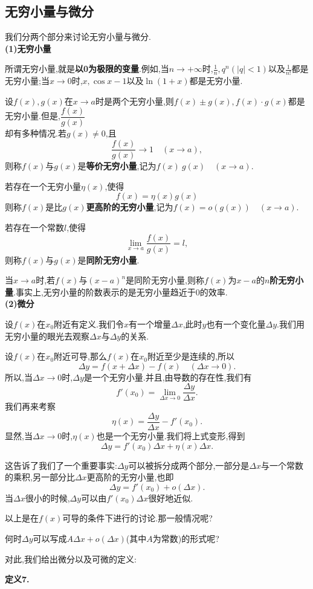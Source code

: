 \documentclass{article}
\begin{document}
\subsection{无穷小量与微分}
我们分两个部分来讨论无穷小量与微分.\\
\textbf{(1)\quad 无穷小量}
\par 所谓无穷小量,就是\textbf{以0为极限的变量}.例如,当$n\to+\infty$时,$\frac{1}{n},q^n(|q|<1)$以及$\frac{1}{n!}$都是无穷小量;当$x\to0$时,$x,\cos{x}-1$以及$\ln{(1+x)}$都是无穷小量.
\par 设$f(x),g(x)$在$x\to a$时是两个无穷小量,则$f(x)\pm g(x),f(x)\cdot g(x)$都是无穷小量.但是,$\dfrac{f(x)}{g(x)}$\\却有多种情况.若$g(x)\neq0$,且
\[\frac{f(x)}{g(x)}\to1\quad(x\to a),\]
则称$f(x)$与$g(x)$是\textbf{等价无穷小量},记为$f(x)~g(x)\quad(x\to a)$.
\par 若存在一个无穷小量$\eta(x)$,使得
\[f(x)=\eta(x)g(x)\]
则称$f(x)$是比$g(x)$\textbf{更高阶的无穷小量},记为$f(x)=o(g(x))\quad(x\to a)$.
\par 若存在一个常数$l$,使得
\[\lim\limits_{x\to a}\frac{f(x)}{g(x)}=l,\]
则称$f(x)$与$g(x)$是\textbf{同阶无穷小量}.
\par 当$x\to a$时,若$f(x)$与$(x-a)^n$是同阶无穷小量,则称$f(x)$为$x-a$的\textbf{$n$阶无穷小量}.事实上,无穷小量的阶数表示的是无穷小量趋近于0的效率.\\[1em]
\textbf{(2)\quad 微分}
\par 设$f(x)$在$x_0$附近有定义.我们令$x$有一个增量$\Delta x$,此时$y$也有一个变化量$\Delta y$.我们用无穷小量的眼光去观察$\Delta x$与$\Delta y$的关系.
\par 设$f(x)$在$x_0$附近可导,那么$f(x)$在$x_0$附近至少是连续的,所以
\[\Delta y=f(x+\Delta x)-f(x)\quad (\Delta x\to0).\]
所以,当$\Delta x\to0$时,$\Delta y$是一个无穷小量.并且,由导数的存在性,我们有
\[f'(x_0)=\lim\limits_{\Delta x\to0}\frac{\Delta y}{\Delta x}.\]
我们再来考察
\[\eta(x)=\frac{\Delta y}{\Delta x}-f'(x_0).\]
显然,当$\Delta x\to0$时,$\eta(x)$也是一个无穷小量.我们将上式变形,得到
\[\Delta y=f'(x_0)\Delta x+\eta(x)\Delta x.\]
\par 这告诉了我们了一个重要事实:$\Delta y$可以被拆分成两个部分,一部分是$\Delta x$与一个常数的乘积,另一部分比$\Delta x$更高阶的无穷小量,也即
\[\Delta y=f'(x_0)+o(\Delta x).\]
当$\Delta x$很小的时候,$\Delta y$可以由$f'(x_0)\Delta x$很好地近似.
\par 以上是在$f(x)$可导的条件下进行的讨论.那一般情况呢?
\par 何时$\Delta y$可以写成$A\Delta x+o(\Delta x)$(其中$A$为常数)的形式呢?
\par 对此,我们给出微分以及可微的定义:
\par \textbf{定义7.}
\end{document}
